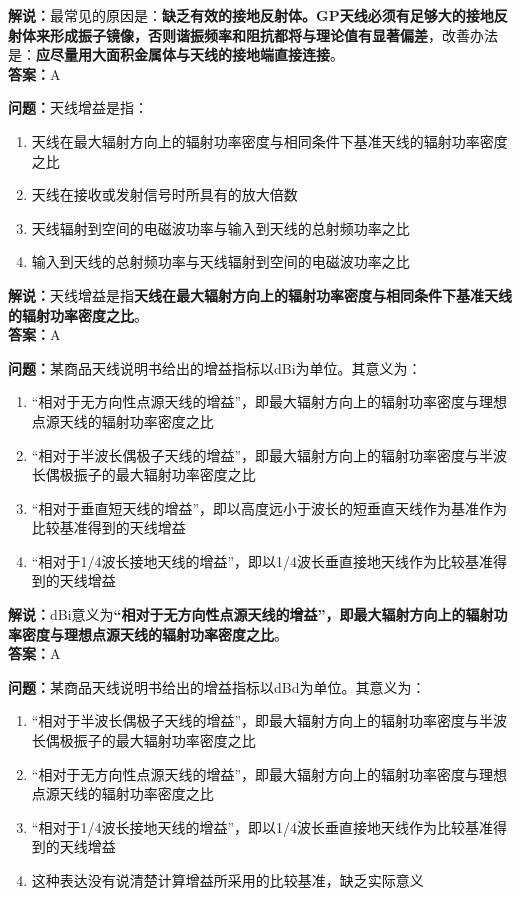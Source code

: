 \textbf{解说：}最常见的原因是：\textbf{缺乏有效的接地反射体。GP天线必须有足够大的接地反射体来形成振子镜像，否则谐振频率和阻抗都将与理论值有显著偏差}，改善办法是：\textbf{应尽量用大面积金属体与天线的接地端直接连接}。\\\textbf{答案：}A



\textbf{问题：}天线增益是指：

\begin{enumerate}[label=\Alph*), leftmargin=1cm]
	\item 天线在最大辐射方向上的辐射功率密度与相同条件下基准天线的辐射功率密度之比
	\item 天线在接收或发射信号时所具有的放大倍数
	\item 天线辐射到空间的电磁波功率与输入到天线的总射频功率之比
	\item 输入到天线的总射频功率与天线辐射到空间的电磁波功率之比
\end{enumerate}

\textbf{解说：}天线增益是指\textbf{天线在最大辐射方向上的辐射功率密度与相同条件下基准天线的辐射功率密度之比}。\\\textbf{答案：}A



\textbf{问题：}某商品天线说明书给出的增益指标以dBi为单位。其意义为：
\begin{enumerate}[label=\Alph*), leftmargin=1cm]
	\item “相对于无方向性点源天线的增益”，即最大辐射方向上的辐射功率密度与理想点源天线的辐射功率密度之比
	\item “相对于半波长偶极子天线的增益”，即最大辐射方向上的辐射功率密度与半波长偶极振子的最大辐射功率密度之比
	\item “相对于垂直短天线的增益”，即以高度远小于波长的短垂直天线作为基准作为比较基准得到的天线增益
	\item “相对于1/4波长接地天线的增益”，即以1/4波长垂直接地天线作为比较基准得到的天线增益
\end{enumerate}

\textbf{解说：}dBi意义为\textbf{“相对于无方向性点源天线的增益”，即最大辐射方向上的辐射功率密度与理想点源天线的辐射功率密度之比}。\\\textbf{答案：}A



\textbf{问题：}某商品天线说明书给出的增益指标以dBd为单位。其意义为：

\begin{enumerate}[label=\Alph*), leftmargin=1cm]
	\item “相对于半波长偶极子天线的增益”，即最大辐射方向上的辐射功率密度与半波长偶极振子的最大辐射功率密度之比
	\item “相对于无方向性点源天线的增益”，即最大辐射方向上的辐射功率密度与理想点源天线的辐射功率密度之比
	\item “相对于1/4波长接地天线的增益”，即以1/4波长垂直接地天线作为比较基准得到的天线增益
	\item 这种表达没有说清楚计算增益所采用的比较基准，缺乏实际意义
\end{enumerate}

